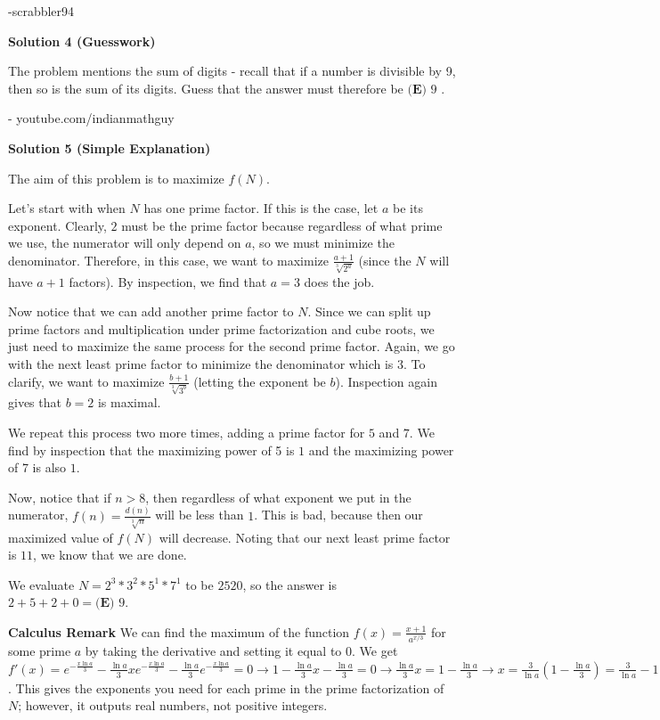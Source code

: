 \begin{enumerate}
 -scrabbler94

 



\textbf{Solution 4 (Guesswork)}

The problem mentions the sum of digits - recall that if a number is divisible by 9, then so is the sum of its digits. Guess that the answer must therefore be $\boxed{\textbf{(E) } 9}$ .

 - youtube.com/indianmathguy

 



\textbf{Solution 5 (Simple Explanation)}

The aim of this problem is to maximize $f(N).$

 Let's start with when $N$ has one prime factor. If this is the case, let $a$ be its exponent. Clearly, $2$ must be the prime factor because regardless of what prime we use, the numerator will only depend on $a$, so we must minimize the denominator. Therefore, in this case, we want to maximize $\frac{a+1}{\sqrt[3]{2^{a}}}$ (since the $N$ will have $a+1$ factors). By inspection, we find that $a=3$ does the job.

 Now notice that we can add another prime factor to $N$. Since we can split up prime factors and multiplication under prime factorization and cube roots, we just need to maximize the same process for the second prime factor. Again, we go with the next least prime factor to minimize the denominator which is $3$. To clarify, we want to maximize $\frac{b+1}{\sqrt[3]{3^{b}}}$ (letting the exponent be $b$). Inspection again gives that $b=2$ is maximal.

 We repeat this process two more times, adding a prime factor for $5$ and $7$. We find by inspection that the maximizing power of 5 is $1$ and the maximizing power of 7 is also $1$. 

 Now, notice that if $n>8$, then regardless of what exponent we put in the numerator, $f(n)=\frac{d(n)}{\sqrt [3]n}$ will be less than $1$. This is bad, because then our maximized value of $f(N)$ will decrease. Noting that our next least prime factor is $11$, we know that we are done.

 We evaluate $N=2^3*3^2*5^1*7^1$ to be $2520$, so the answer is $2+5+2+0 = \boxed{\textbf{(E) }9}$.

 \textbf{Calculus Remark} We can find the maximum of the function $f(x)=\frac{x+1}{a^{x/3}}$ for some prime $a$ by taking the derivative and setting it equal to $0$. We get $f'(x) = e^{-\frac{x\ln a}{3}}-\frac{\ln a}{3}xe^{-\frac{x\ln a}{3}}-\frac{\ln a}{3}e^{-\frac{x\ln a}{3}} = 0 \to 1-\frac{\ln a}{3}x - \frac{\ln a}{3}=0 \to \frac{\ln a}{3}x = 1-\frac{\ln a}{3} \to x = \frac{3}{\ln a}\left( 1-\frac{\ln a}{3} \right) = \frac{3}{\ln a}-1$. This gives the exponents you need for each prime in the prime factorization of $N$; however, it outputs real numbers, not positive integers.


\end{enumerate}

